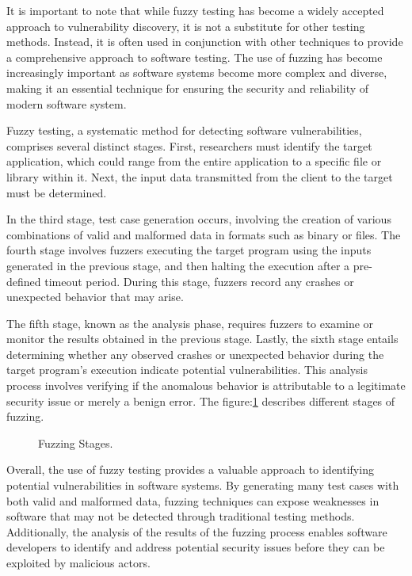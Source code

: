 It is important to note that while fuzzy testing has become a widely accepted approach to
vulnerability discovery, it is not a substitute for other testing methods.
Instead, it is often used in conjunction with other techniques to provide a comprehensive
approach to software testing. The use of fuzzing has become increasingly important as software
systems become more complex and diverse, making it an essential technique for ensuring the security
and reliability of modern software system\cite{kim2011efficient}.

Fuzzy testing, a systematic method for detecting software vulnerabilities,
comprises several distinct stages. First, researchers must identify the target application,
which could range from the entire application to a specific file or library within it\cite{segedyfuzz}.
Next, the input data transmitted from the client to the target must be determined.

In the third stage, test case generation occurs, involving the creation of various combinations of
valid and malformed data in formats such as binary or files. The fourth stage involves fuzzers
executing the target program using the inputs generated in the previous stage, and then
halting the execution after a pre-defined timeout period. During this stage, fuzzers
record any crashes or unexpected behavior that may arise.

The fifth stage, known as the analysis phase, requires fuzzers to examine or monitor the results
obtained in the previous stage. Lastly, the sixth stage entails determining whether any observed
crashes or unexpected behavior during the target program's execution indicate potential
vulnerabilities. This analysis process involves verifying if the anomalous behavior is
attributable to a legitimate security issue or merely a benign error.
\clearpage
The figure:\ref{fig:fuzzy_testing_phases} describes different stages of fuzzing.

\begin{figure}[h!]
        \centering
        \caption{Fuzzing Stages\cite{segedyfuzz}\cite{9742291}.}\label{fig:fuzzy_testing_phases}
\end{figure}

Overall, the use of fuzzy testing provides a valuable approach to identifying potential
vulnerabilities in software systems. By generating many test cases with both
valid and malformed data, fuzzing techniques can expose weaknesses in software that may not be
detected through traditional testing methods. Additionally, the analysis of the results of the
fuzzing process enables software developers to identify and address potential security issues
before they can be exploited by malicious actors.\newline

